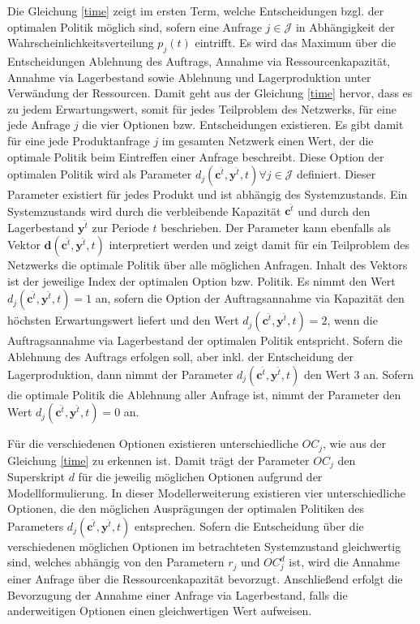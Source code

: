 Die Gleichung \eqref{time} zeigt im ersten Term, welche Entscheidungen bzgl. der optimalen Politik möglich sind, sofern eine Anfrage $j\in\mathcal J$ in Abhängigkeit der Wahrscheinlichkeitsverteilung $p_j(t)$ eintrifft. Es wird das Maximum über die Entscheidungen \glqq Ablehnung des Auftrags{\grqq}, \glqq Annahme via Ressourcenkapazität{\grqq}, \glqq Annahme via Lagerbestand{\grqq} sowie \glqq Ablehnung und Lagerproduktion unter Verwändung der Ressourcen{\grqq}. Damit geht aus der Gleichung \eqref{time} hervor, dass es zu jedem Erwartungswert, somit für jedes Teilproblem des Netzwerks, für eine jede Anfrage $j$ die vier Optionen bzw. Entscheidungen existieren. Es gibt damit für eine jede Produktanfrage $j$ im gesamten Netzwerk einen Wert, der die optimale Politik beim Eintreffen einer Anfrage beschreibt. Diese Option der optimalen Politik wird als Parameter $d_j({\textbf{c}^{\hat t},\textbf{y}^{\hat t},t})\forall j\in\mathcal{J}$ definiert. Dieser Parameter existiert für jedes Produkt und ist abhängig des Systemzustands. Ein Systemzustands wird durch die verbleibende Kapazität $\textbf{c}^{\hat t}$ und durch den Lagerbestand $\textbf{y}^{\hat t}$ zur Periode $t$ beschrieben. Der Parameter kann ebenfalls als Vektor $\textbf{d}({\textbf{c}^{\hat t},\textbf{y}^{\hat t},t})$ interpretiert werden und zeigt damit für ein Teilproblem des Netzwerks die optimale Politik über alle möglichen Anfragen. Inhalt des Vektors ist der jeweilige Index der optimalen Option bzw. Politik. Es nimmt den Wert $d_j({\textbf{c}^{\hat t},\textbf{y}^{\hat t},t})=1$ an, sofern die Option der Auftragsannahme via Kapazität den höchsten Erwartungswert liefert und den Wert $d_j({\textbf{c}^{\hat t},\textbf{y}^{\hat t},t})=2$, wenn die Auftragsannahme via Lagerbestand der optimalen Politik entspricht. Sofern die Ablehnung des Auftrags erfolgen soll, aber inkl. der Entscheidung der Lagerproduktion, dann nimmt der Parameter $d_j({\textbf{c}^{\hat t},\textbf{y}^{\hat t},t})$ den Wert $3$ an. Sofern die optimale Politik die Ablehnung aller Anfrage ist, nimmt der Parameter den Wert $d_j({\textbf{c}^{\hat t},\textbf{y}^{\hat t},t})=0$ an.

Für die verschiedenen Optionen existieren unterschiedliche $OC_{j}$, wie aus der Gleichung \eqref{time} zu erkennen ist. Damit trägt der Parameter $OC_{j}$ den Superskript $d$ für die jeweilig möglichen Optionen aufgrund der Modellformulierung. In dieser Modellerweiterung existieren vier unterschiedliche Optionen, die den möglichen Ausprägungen der optimalen Politiken des Parameters $d_{j}(\textbf{c}^{\hat t},\textbf{y}^{\hat t},t)$ entsprechen. Sofern die Entscheidung über die verschiedenen möglichen Optionen im betrachteten Systemzustand gleichwertig sind, welches abhängig von den Parametern $r_{j}$ und $OC_j^{d}$ ist, wird die Annahme einer Anfrage über die Ressourcenkapazität bevorzugt. Anschließend erfolgt die Bevorzugung der Annahme einer Anfrage via Lagerbestand, falls die anderweitigen Optionen einen gleichwertigen Wert aufweisen.

